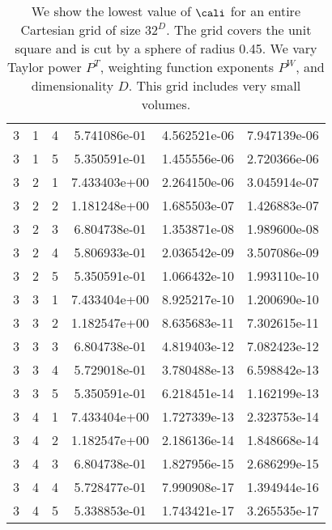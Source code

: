 \documentclass{article}
\begin{document}
{\begin{small}
\begin{table}
\begin{center}
\begin{tabular}{|ccc|ccc|}
3 & 1 & 4 &  5.741086e-01 & 4.562521e-06 & 7.947139e-06 \\ 
3 & 1 & 5 &  5.350591e-01 & 1.455556e-06 & 2.720366e-06 \\ 
3 & 2 & 1 &  7.433403e+00 & 2.264150e-06 & 3.045914e-07 \\ 
3 & 2 & 2 &  1.181248e+00 & 1.685503e-07 & 1.426883e-07 \\ 
3 & 2 & 3 &  6.804738e-01 & 1.353871e-08 & 1.989600e-08 \\ 
3 & 2 & 4 &  5.806933e-01 & 2.036542e-09 & 3.507086e-09 \\ 
3 & 2 & 5 &  5.350591e-01 & 1.066432e-10 & 1.993110e-10 \\ 
3 & 3 & 1 &  7.433404e+00 & 8.925217e-10 & 1.200690e-10 \\ 
3 & 3 & 2 &  1.182547e+00 & 8.635683e-11 & 7.302615e-11 \\ 
3 & 3 & 3 &  6.804738e-01 & 4.819403e-12 & 7.082423e-12 \\ 
3 & 3 & 4 &  5.729018e-01 & 3.780488e-13 & 6.598842e-13 \\ 
3 & 3 & 5 &  5.350591e-01 & 6.218451e-14 & 1.162199e-13 \\ 
3 & 4 & 1 &  7.433404e+00 & 1.727339e-13 & 2.323753e-14 \\ 
3 & 4 & 2 &  1.182547e+00 & 2.186136e-14 & 1.848668e-14 \\ 
3 & 4 & 3 &  6.804738e-01 & 1.827956e-15 & 2.686299e-15 \\ 
3 & 4 & 4 &  5.728477e-01 & 7.990908e-17 & 1.394944e-16 \\ 
3 & 4 & 5 &  5.338853e-01 & 1.743421e-17 & 3.265535e-17 \\ 
\hline
\end{tabular}
\end{center}
\label{fig::unmergedSolvability}
\caption
    {
      We show the lowest value of
      $\cali$ for an entire Cartesian grid of size $32^D$.
      The grid covers the unit square and is cut by a sphere of radius 0.45.
      We vary Taylor power $P^T$, weighting
      function exponents $P^W$, and dimensionality $D$.    This grid
      includes very small volumes.
    }
\end{table}
\end{small}


}
\end{document}
